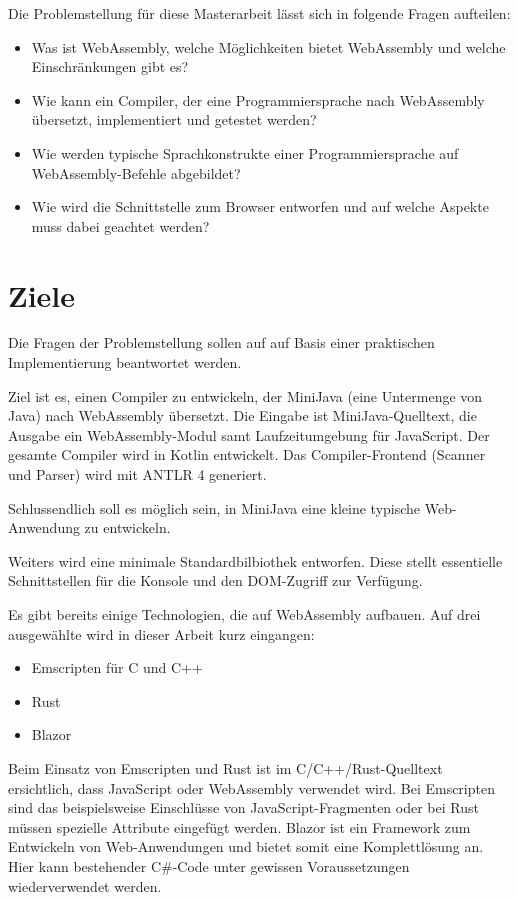 Die Problemstellung für diese Masterarbeit lässt sich in folgende Fragen aufteilen:

\begin{itemize}
	\item Was ist WebAssembly, welche Möglichkeiten bietet WebAssembly und welche Einschränkungen gibt es?
	\item Wie kann ein Compiler, der eine Programmiersprache nach WebAssembly übersetzt, implementiert und getestet werden?
	\item Wie werden typische Sprachkonstrukte einer Programmiersprache auf Web\-Assem\-bly-Befehle abgebildet?
	\item Wie wird die Schnittstelle zum Browser entworfen und auf welche Aspekte muss dabei geachtet werden?
\end{itemize}

\section{Ziele}

Die Fragen der Problemstellung sollen auf auf Basis einer praktischen Implementierung beantwortet werden.

Ziel ist es, einen Compiler zu entwickeln, der MiniJava (eine Untermenge von Java) nach WebAssembly übersetzt. Die Eingabe ist MiniJava-Quelltext, die Ausgabe ein WebAssembly-Modul samt Laufzeitumgebung für JavaScript. Der gesamte Compiler wird in Kotlin entwickelt. Das Compiler-Frontend (Scanner und Parser) wird mit ANTLR 4 generiert.

Schlussendlich soll es möglich sein, in MiniJava eine kleine typische Web-Anwendung zu entwickeln.

Weiters wird eine minimale Standardbilbiothek entworfen. Diese stellt essentielle Schnittstellen für die Konsole und den DOM-Zugriff zur Verfügung.

Es gibt bereits einige Technologien, die auf WebAssembly aufbauen. Auf drei ausgewählte wird in dieser Arbeit kurz eingangen:
\begin{itemize}
    \item Emscripten \cite{Emscripten} für C und C++
    \item Rust \cite{RustWasmWebsite}
    \item Blazor \cite{Blazor}
\end{itemize}

Beim Einsatz von Emscripten und Rust ist im C/C++/Rust-Quelltext ersichtlich, dass JavaScript oder WebAssembly verwendet wird. Bei Emscripten sind das beispielsweise Einschlüsse von JavaScript-Fragmenten oder bei Rust müssen spezielle Attribute eingefügt werden. Blazor ist ein Framework zum Entwickeln von Web-Anwendungen und bietet somit eine Komplettlösung an. Hier kann bestehender C\#{}-Code unter gewissen Voraussetzungen wiederverwendet werden.


